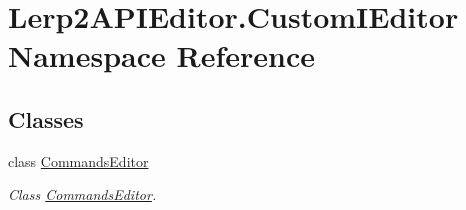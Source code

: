\hypertarget{namespace_lerp2_a_p_i_editor_1_1_custom_i_editor}{}\section{Lerp2\+A\+P\+I\+Editor.\+Custom\+I\+Editor Namespace Reference}
\label{namespace_lerp2_a_p_i_editor_1_1_custom_i_editor}
\subsection*{Classes}
\begin{DoxyCompactItemize}
\item 
class \hyperlink{class_lerp2_a_p_i_editor_1_1_custom_i_editor_1_1_commands_editor}{Commands\+Editor}
\begin{DoxyCompactList}\small\item\em Class \hyperlink{class_lerp2_a_p_i_editor_1_1_custom_i_editor_1_1_commands_editor}{Commands\+Editor}. \end{DoxyCompactList}\end{DoxyCompactItemize}
